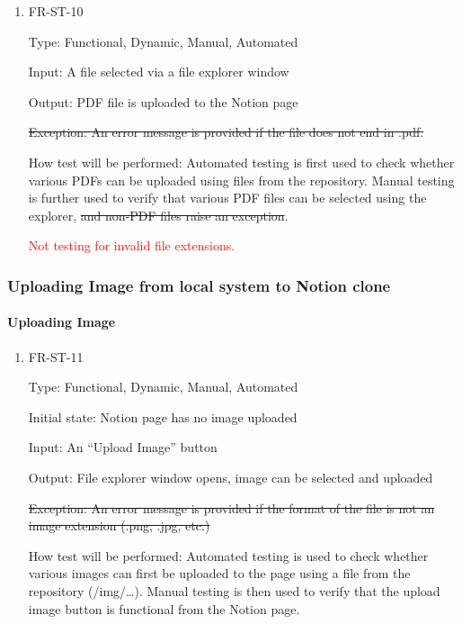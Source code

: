 \documentclass[12pt, titlepage]{article}
\begin{document}
\begin{enumerate}

\item{FR-ST-10\\}

Type: Functional, Dynamic, Manual, Automated 

Input: A file selected via a file explorer window 

Output: PDF file is uploaded to the Notion page 

\sout{Exception: An error message is provided if the file does not end in .pdf.}  

How test will be performed: Automated testing is first used to check whether various PDFs can be uploaded using files from the repository. Manual testing is further used to verify that various PDF files can be selected using the explorer, \sout{and non-PDF files raise an exception}. 

\textcolor{red}{Not testing for invalid file extensions.}

\end{enumerate}

\subsubsection{Uploading Image from local system to Notion clone}

\paragraph{Uploading Image}

\begin{enumerate}

\item{FR-ST-11\\}

Type: Functional, Dynamic, Manual, Automated 

Initial state: Notion page has no image uploaded 

Input: An “Upload Image” button 

Output: File explorer window opens, image can be selected and uploaded 

\sout{Exception: An error message is provided if the format of the file is not an image extension (.png, .jpg, etc.)} 

How test will be performed: Automated testing is used to check whether various images can first be uploaded to the page using a file from the repository (/img/…). Manual testing is then used to verify that the upload image button is functional from the Notion page.

\end{enumerate}
\end{document}
